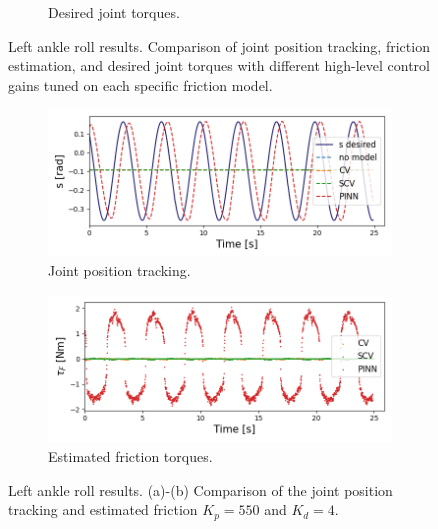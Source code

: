 \begin{figure}[t]
\begin{subfigure}{.98\textwidth}
  \vspace{-20pt}
  \caption{Desired joint torques.}
  \label{fig:kptorqueankle}
\end{subfigure}
\vspace{-5pt}
\caption{Left ankle roll results. Comparison of joint position tracking, friction estimation, and desired joint torques with different high-level control gains tuned on each specific friction model.}
\vspace{-10pt}
\end{figure}
\begin{figure}[t]
\centering
\begin{subfigure}{.48\textwidth}
  \includegraphics[width=0.98\linewidth,center]{figures/sinusoid_tracking.png}
  \vspace{-20pt}
  \caption{Joint position tracking.}
  \label{fig:kp550trackingankle}
\end{subfigure}%
\hspace{\fill} %
\begin{subfigure}{.48\textwidth}
  \includegraphics[width=0.98\linewidth,center]{figures/friction_kp_550.png}
  \vspace{-20pt}
  \caption{Estimated friction torques.}
  \label{fig:kp550frictionankle}
\end{subfigure}
\vspace{-5pt}
\caption{Left ankle roll results. (a)-(b) Comparison of the joint position tracking and estimated friction $K_p=550$ and $K_d=4$.}
\vspace{-15pt}
\end{figure}

